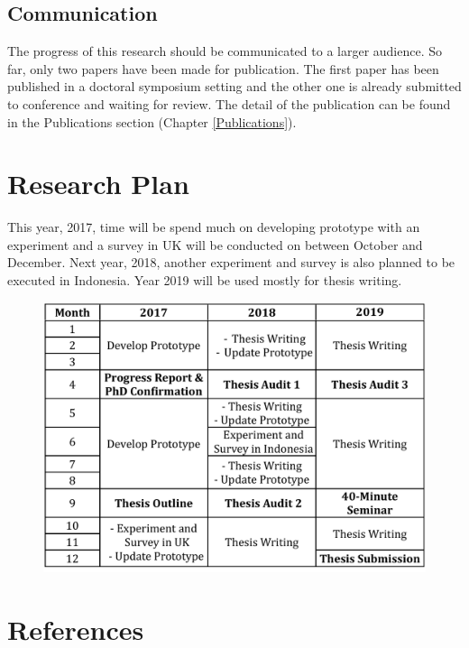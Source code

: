 \documentclass[12pt, a4paper]{report} \usepackage[titletoc]{appendix}
\begin{document}
\section{Communication}
The progress of this research should be communicated to a larger audience. So far, only two papers have been made for publication. The first paper has been published in a doctoral symposium setting and the other one is already submitted to conference and waiting for review. The detail of the publication can be found in the Publications section (Chapter \ref{Publications}).

\chapter{Research Plan}
\label{Research Plan}
This year, 2017, time will be spend much on developing prototype with an experiment and a survey in UK will be conducted on between October and December. Next year, 2018, another experiment and survey is also planned to be executed in Indonesia. Year 2019 will be used mostly for thesis writing.

\begin {table}[ht]
\caption {Research Timetable} 
\end{table}
\begin{figure}[ht]
\centering
\includegraphics[width=\textwidth]{timetable}
\end{figure}

\chapter{References}
\label{References}
\end{document}
